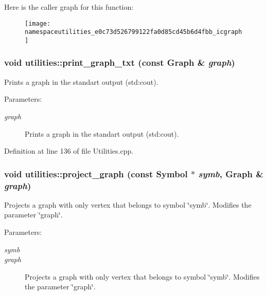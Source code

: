 Here is the caller graph for this function:\nopagebreak
\begin{figure}[H]
\begin{center}
\leavevmode
\texttt{[image: namespaceutilities\_e0c73d526799122fa0d85cd45b6d4fbb\_icgraph]}
\end{center}
\end{figure}
\hypertarget{namespaceutilities_bef7212b8948ccd35dcfa554508f9b1d}{
\subsubsection[{print\_\-graph\_\-txt}]{\setlength{\rightskip}{0pt plus 5cm}void utilities::print\_\-graph\_\-txt (const Graph \& {\em graph})}}
\label{namespaceutilities_bef7212b8948ccd35dcfa554508f9b1d}


Prints a graph in the standart output (std:cout). \begin{Desc}
\item[Parameters:]
\begin{description}
\item[{\em graph}]Prints a graph in the standart output (std:cout). \end{description}
\end{Desc}


Definition at line 136 of file Utilities.cpp.\hypertarget{namespaceutilities_f78e9e1ebc91d6896a01f45d611cca0a}{
\subsubsection[{project\_\-graph}]{\setlength{\rightskip}{0pt plus 5cm}void utilities::project\_\-graph (const {\bf Symbol} $\ast$ {\em symb}, \/  Graph \& {\em graph})}}
\label{namespaceutilities_f78e9e1ebc91d6896a01f45d611cca0a}


Projects a graph with only vertex that belongs to symbol \char`\"{}symb\char`\"{}. Modifies the parameter \char`\"{}graph\char`\"{}. \begin{Desc}
\item[Parameters:]
\begin{description}
\item[{\em symb}]\item[{\em graph}]Projects a graph with only vertex that belongs to symbol \char`\"{}symb\char`\"{}. Modifies the parameter \char`\"{}graph\char`\"{}. \end{description}
\end{Desc}


